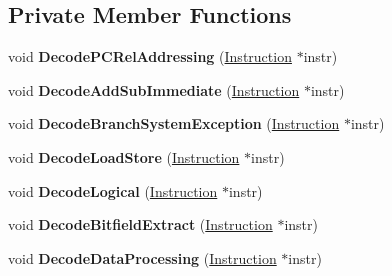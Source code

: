 \subsection*{Private Member Functions}
\begin{DoxyCompactItemize}
\item 
void {\bfseries Decode\+P\+C\+Rel\+Addressing} (\hyperlink{classv8_1_1internal_1_1_instruction}{Instruction} $\ast$instr)\hypertarget{classv8_1_1internal_1_1_decoder_a22114d9554994a76e2e1fbf0dc41b557}{}\label{classv8_1_1internal_1_1_decoder_a22114d9554994a76e2e1fbf0dc41b557}

\item 
void {\bfseries Decode\+Add\+Sub\+Immediate} (\hyperlink{classv8_1_1internal_1_1_instruction}{Instruction} $\ast$instr)\hypertarget{classv8_1_1internal_1_1_decoder_a718e18bdfe7f5701778864621d16a3e4}{}\label{classv8_1_1internal_1_1_decoder_a718e18bdfe7f5701778864621d16a3e4}

\item 
void {\bfseries Decode\+Branch\+System\+Exception} (\hyperlink{classv8_1_1internal_1_1_instruction}{Instruction} $\ast$instr)\hypertarget{classv8_1_1internal_1_1_decoder_ad578580ec6e54eda49df7a47a4580b24}{}\label{classv8_1_1internal_1_1_decoder_ad578580ec6e54eda49df7a47a4580b24}

\item 
void {\bfseries Decode\+Load\+Store} (\hyperlink{classv8_1_1internal_1_1_instruction}{Instruction} $\ast$instr)\hypertarget{classv8_1_1internal_1_1_decoder_a848fab78f318baf4ce71352d4525e078}{}\label{classv8_1_1internal_1_1_decoder_a848fab78f318baf4ce71352d4525e078}

\item 
void {\bfseries Decode\+Logical} (\hyperlink{classv8_1_1internal_1_1_instruction}{Instruction} $\ast$instr)\hypertarget{classv8_1_1internal_1_1_decoder_a71137619b70146e17d46947f34d396c5}{}\label{classv8_1_1internal_1_1_decoder_a71137619b70146e17d46947f34d396c5}

\item 
void {\bfseries Decode\+Bitfield\+Extract} (\hyperlink{classv8_1_1internal_1_1_instruction}{Instruction} $\ast$instr)\hypertarget{classv8_1_1internal_1_1_decoder_ad1c4e0760796be5971cfa606e67710db}{}\label{classv8_1_1internal_1_1_decoder_ad1c4e0760796be5971cfa606e67710db}

\item 
void {\bfseries Decode\+Data\+Processing} (\hyperlink{classv8_1_1internal_1_1_instruction}{Instruction} $\ast$instr)\hypertarget{classv8_1_1internal_1_1_decoder_a39debfa2cde72d8a9cdab27d5336ab3f}{}\label{classv8_1_1internal_1_1_decoder_a39debfa2cde72d8a9cdab27d5336ab3f}


\end{DoxyCompactItemize}
